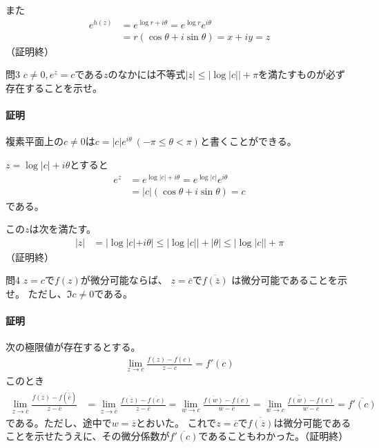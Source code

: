 また
\begin{align*}
    e^{h(z)}&=e^{\log r+i\theta}=e^{\log r}e^{i\theta}\\
    &=r(\cos\theta+i\sin\theta)=x+iy=z
\end{align*}
（証明終）

\begin{mysimplebox}{問3}
    $c\neq0,e^z=c$である$z$のなかには不等式$|z|\le|\log|c||+\pi$を満たすものが必ず存在することを示せ。
\end{mysimplebox}
\paragraph{証明}
複素平面上の$c\neq0$は$c=|c|e^{i\theta}\ (-\pi\le\theta<\pi)$と書くことができる。

$z=\log|c|+i\theta$とすると
\begin{align*}
    e^z&=e^{\log|c|+i\theta}=e^{\log|c|}e^{i\theta}\\
    &=|c|(\cos\theta+i\sin\theta)=c
\end{align*}
である。

この$z$は次を満たす。
\begin{align*}
    |z|&=|\log|c|+i\theta|\le|\log|c||+|\theta|\le|\log|c||+\pi
\end{align*}
（証明終）

\begin{mysimplebox}{問4}
    $z=c$で$f(z)$が微分可能ならば、
    $z=\overline{c}$で$\overline{f(\overline{z})}$
    は微分可能であることを示せ。
    ただし、$\Im c\neq0$である。
\end{mysimplebox}
\paragraph{証明}
次の極限値が存在するとする。
\begin{align*}
    \lim_{z\to c}\frac{f(z)-f(c)}{z-c}=f'(c)
\end{align*}    
このとき
\begin{align*}
    \lim_{z\to\overline{c}}
    \frac{\overline{f(\overline{z})}-\overline{f(\overline{\overline{c}})}}{z-\overline{c}}
    &=\lim_{z\to\overline{c}}
    \frac{\overline{f(\overline{z})}-\overline{f(c)}}{z-\overline{c}}
    =\lim_{w\to c}
    \frac{\overline{f(w)}-\overline{f(c)}}{\overline{w}-\overline{c}}
    =\overline{\lim_{w\to c}\frac{f(w)-f(c)}{w-c}}
    =\overline{f'(c)}
\end{align*}
である。ただし、途中で$w=\overline{z}$とおいた。
これで$z=\overline{c}$で$\overline{f(\overline{z})}$は微分可能であることを示せたうえに、その微分係数が$\overline{f'(c)}$であることもわかった。（証明終）

